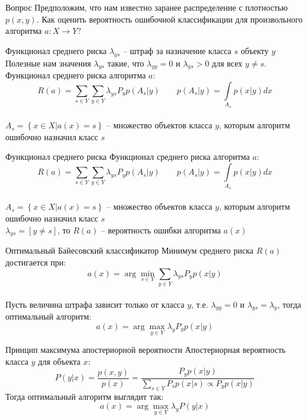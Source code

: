 \documentclass[10pt]{beamer}
\begin{document}
\begin{frame}{Вопрос}
  \centering
  Предположим, что нам известно заранее распределение с плотностью $p(x, y)$. Как оценить вероятность ошибочной классификации для произвольного алгоритма $a: X \rightarrow Y$?
\end{frame}

\begin{frame}{Функционал среднего риска}
  $\lambda_{ys}$ -- штраф за назначение класса $s$ объекту $y$\\
  \pause
  \bigbreak
  \alert{Полезные} нам значения $\lambda_{ys}$ такие, что $\lambda_{yy} = 0$ и $\lambda_{ys} > 0$ для всех $y \neq s$.
  \pause
  \bigbreak
  Функционал среднего риска алгоритма $a$:\\
  $$R(a) = \sum\limits_{s \in Y} \sum\limits_{y \in Y} \lambda_{ys} P_y p(A_s|y) \qquad p(A_s|y) = \int\limits_{A_s} p(x|y) dx$$\\
  $A_s = \left\{ x \in X | a(x) = s \right\}$ -- множество объектов класса $y$, которым алгоритм ошибочно назначил класс $s$
\end{frame}

\begin{frame}{Функционал среднего риска}
  Функционал среднего риска алгоритма $a$:\\
  $$R(a) = \sum\limits_{s \in Y} \sum\limits_{y \in Y} \lambda_{ys} P_y p(A_s|y) \qquad p(A_s|y) = \int\limits_{A_s} p(x|y) dx$$\\
  $A_s = \left\{ x \in X | a(x) = s \right\}$ -- множество объектов класса $y$, которым алгоритм ошибочно назначил класс $s$\\
  \bigbreak
  \pause
  $\lambda_{ys} = \left[ y \neq s \right]$, то $R(a)$ -- вероятность ошибки алгоритма $a(x)$
\end{frame}

{
\begin{frame}{Оптимальный Байесовский классификатор}
  Минимум среднего риска $R(a)$ достигается при:\\
  $$a(x) = \arg\min\limits_{s \in Y} \sum \limits_{y \in Y} \lambda_{ys} P_y p(x|y)$$\\
  \bigbreak
  \pause
  Пусть величина штрафа зависит только от класса $y$, т.е. $\lambda_{yy} = 0$ и $\lambda_{ys} = \lambda_y$, тогда оптимальный алгоритм:\\
  $$a(x) = \arg\max\limits_{y \in Y} \lambda_y P_y p(x|y)$$
\end{frame}
}

{
\begin{frame}{Принцип максимума апостериорной вероятности}
  Апостериорная вероятность класса $y$ для объекта $x$:
  $$P(y|x) = \frac{p(x,y)}{p(x)} = \frac{P_yp(x|y)}{\sum\limits_{s \in Y} P_s p(x|s) \propto P_y p(x|y)}$$
  \pause
  Тогда оптимальный алгоритм выглядит так:
  $$a(x) = \arg\max\limits_{y \in Y} \lambda_y P(y|x)$$
\end{frame}
}
\end{document}
